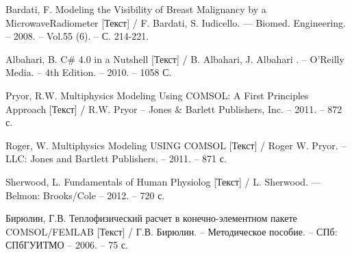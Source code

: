 \newpage
{}
\begin{thebibliography}{3}
	 Bardati, F. Modeling the Visibility of Breast Malignancy by a MicrowaveRadiometer [Текст] / F. Bardati, S. Iudicello. — Biomed. Engineering. -- 2008. -- Vol.55 (6). -- С. 214-221.
	
	 Albahari, B. C\# 4.0 in a Nutshell [Текст] / B. Albahari, J. Albahari . -- O'Reilly Media. -- 4th Edition. -- 2010. -- 1058 С.
	
	 Pryor, R.W. Multiphysics Modeling Using COMSOL: A First Principles Approach [Текст] / R.W. Pryor -- Jones \& Barlett Publishers, Inc. -- 2011. -- 872 с.
	
	 Roger, W. Multiphysics Modeling USING COMSOL [Текст] / Roger W. Pryor. -- LLC: Jones and Bartlett Publishers. -- 2011. -- 871 с.
	
	 Sherwood, L. Fundamentals of Human Physiolog [Текст] / L. Sherwood. — Belmon: Brooks/Cole -- 2012. -- 720 с.
	
	 Бирюлин, Г.В. Теплофизический расчет в конечно-элементном пакете COMSOL/FEMLAB [Текст] / Г.В. Бирюлин. -- Методическое пособие. -- СПб: СПбГУИТМО -- 2006. -- 75 с.
\end{thebibliography}